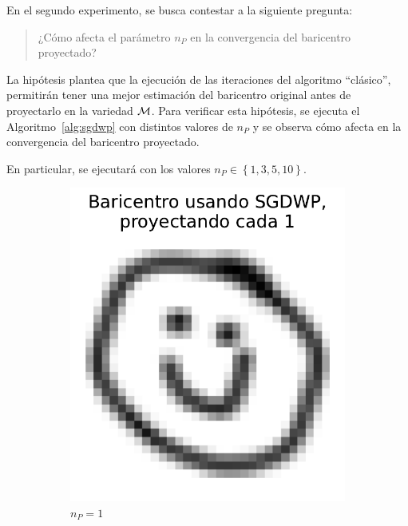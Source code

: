 En el segundo experimento, se busca contestar a la siguiente pregunta:
\begin{quotation}
    \centering
    ¿Cómo afecta el parámetro $n_P$ en la convergencia del baricentro proyectado?
\end{quotation}
La hipótesis plantea que la ejecución de las iteraciones del algoritmo ``clásico'', permitirán tener una mejor estimación del baricentro original antes de proyectarlo en la variedad $\operatorname{\mathcal{M}}$. Para verificar esta hipótesis, se ejecuta el Algoritmo~\ref{alg:sgdwp} con distintos valores de $n_P$ y se observa cómo afecta en la convergencia del baricentro proyectado.

En particular, se ejecutará con los valores $n_P \in \left\{ 1, 3, 5, 10 \right\}$.

\begin{figure}[htbp]
    \centering
    \begin{subfigure}[b]{0.23\textwidth}
        \centering
        \includegraphics[width=\textwidth]{img/sgdwp-pe/bar-SGDWP-pe-01.pdf}
        \caption{$n_P=1$}
        \label{fig:bar-SGDWP-pe-01}
    \end{subfigure}
    \hfill
    \begin{subfigure}[b]{0.23\textwidth}

\end{subfigure}
\end{figure}
